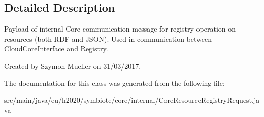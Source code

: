 \subsection{Detailed Description}
Payload of internal Core communication message for registry operation on resources (both R\+DF and J\+S\+ON). Used in communication between Cloud\+Core\+Interface and Registry. 

Created by Szymon Mueller on 31/03/2017. 

The documentation for this class was generated from the following file\+:\begin{DoxyCompactItemize}
\item 
src/main/java/eu/h2020/symbiote/core/internal/Core\+Resource\+Registry\+Request.\+java\end{DoxyCompactItemize}
